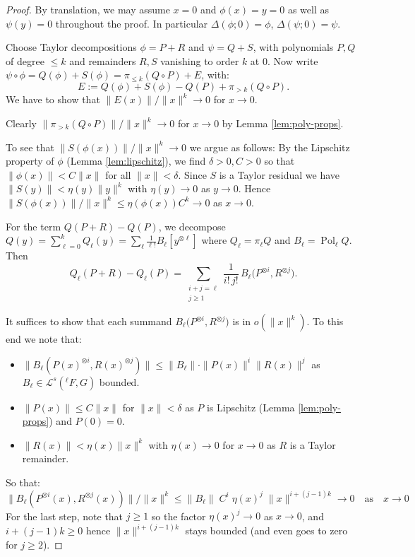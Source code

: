 \documentclass[10pt,a4paper]{amsart}
\DeclareMathOperator{\Pol}{Pol} %
\newcommand{\KL}{\mathcal{L}}
\newcommand{\qtext}[1]{\quad\text{#1}\quad} %
\newcommand{\ra}{\rightarrow} %
\newcommand{\tensor}{\otimes} %
\newcommand{\tightlist}{\setlength{\itemsep}{0pt}\setlength{\parskip}{0pt}}
\begin{document}
\begin{proof}

By translation, we may assume \(x=0\) and \(\phi(x) = y = 0\) as well as
\(\psi(y) = 0\) throughout the proof. In particular
\(\Delta(\phi; 0) = \phi\), \(\Delta(\psi; 0) = \psi\).

Choose Taylor decompositions \(\phi = P + R\) and \(\psi = Q + S\), with
polynomials \(P,Q\) of degree \(\le k\) and remainders \(R,S\) vanishing
to order \(k\) at \(0\). Now write
\(\psi\circ\phi = Q(\phi) + S(\phi)=\pi_{\le k}(Q\circ P) + E\), with:
\[
  E := Q(\phi) + S(\phi) - Q(P) + \pi_{> k}(Q\circ P).
\] We have to show that \(\|E(x)\| / \|x\|^k \to 0\) for \(x \to 0\).

Clearly \(\| \pi_{> k}(Q\circ P) \| / \|x\|^k \to 0\) for \(x \to 0\) by
Lemma \ref{lem:poly-props}.

To see that \(\|S(\phi(x))\|/\|x\|^k \to 0\) we argue as follows: By the
Lipschitz property of \(\phi\) (Lemma \ref{lem:lipschitz}), we find
\(\delta > 0, C > 0\) so that \(\|\phi(x)\| < C \|x\|\) for all
\(\|x\| < \delta\). Since \(S\) is a Taylor residual we have
\(\|S(y)\| < \eta(y) \|y\|^k\) with \(\eta(y) \to 0\) as \(y \to 0\).
Hence \(\|S(\phi(x))\|/\|x\|^k \leq \eta(\phi(x)) C^k \to 0\) as
\(x \to 0\).

For the term \(Q(P+R) - Q(P)\), we decompose
\(Q(y) = \sum_{\ell=0}^k Q_\ell(y) = \sum_\ell \frac{1}{\ell!} B_\ell[y^{\tensor \ell}]\)
where \(Q_\ell = \pi_\ell Q\) and \(B_\ell = \Pol_\ell Q\). Then \[
  Q_\ell(P+R) - Q_\ell(P)
  = \sum_{\substack{i+j=\ell\\ j\ge1}} \frac{1}{i!\,j!}\,B_\ell\big(P^{\tensor i}, R^{\tensor j}\big).
\]

It suffices to show that each summand
\(B_\ell\big(P^{\tensor i}, R^{\tensor j})\) is in \(o(\|x\|^k)\). To
this end we note that:

\begin{itemize}
\tightlist
\item
  \(\|B_\ell(P(x)^{\tensor i}, R(x)^{\tensor j})\| \leq \|B_\ell\| \cdot \|P(x)\|^i \|R(x)\|^j\)
  as \(B_\ell \in \KL^s(^\ell F,G)\) bounded.
\item
  \(\|P(x)\| \le C\|x\|\) for \(\|x\| < \delta\) as \(P\) is Lipschitz
  (Lemma \ref{lem:poly-props}) and \(P(0) = 0\).
\item
  \(\|R(x)\| < \eta(x) \|x\|^k\) with \(\eta(x) \ra 0\) for \(x \to 0\)
  as \(R\) is a Taylor remainder.
\end{itemize}

So that: \[
  \|B_\ell(P^{\tensor i}(x),R^{\tensor j}(x))\| / \|x\|^k
  \leq
  \|B_\ell\| \; C^i \; \eta(x)^j \; \|x\|^{i + (j - 1) k}
  \to 0 \qtext{as} x \to 0
\] For the last step, note that \(j \geq 1\) so the factor
\(\eta(x)^j \to 0\) as \(x \to 0\), and \(i + (j - 1) k \geq 0\) hence
\(\|x\|^{i + (j - 1) k}\) stays bounded (and even goes to zero for
\(j \geq 2\)).

\end{proof}
\end{document}
